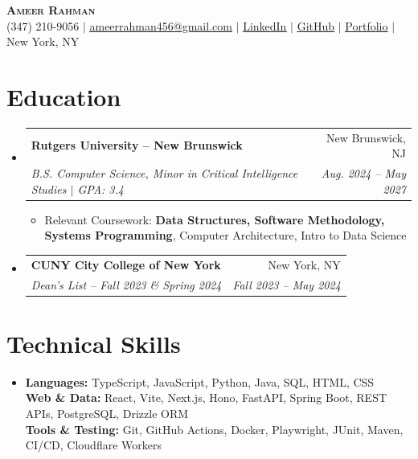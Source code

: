 \documentclass[letterpaper,10pt]{article}
\makeatletter
\newcommand{\resumeItem}[1]{\item\small{#1}}
\newcommand{\resumeSubheading}[4]{
  \vspace{1pt}\item
  \begin{tabular*}{0.97\textwidth}[t]{l@{\extracolsep{\fill}}r}
    \textbf{#1} & #2 \\
    \textit{\small #3} & \textit{\small #4} \\
  \end{tabular*}\vspace{-3pt}
}
\newcommand{\resumeSubHeadingListStart}{\begin{itemize}[leftmargin=0.15in,label={},itemsep=0pt,topsep=0pt]}
\newcommand{\resumeSubHeadingListEnd}{\end{itemize}}
\newcommand{\resumeItemListStart}{\begin{itemize}[leftmargin=0.15in,label=\textbullet,itemsep=-2pt,topsep=0pt]}
\newcommand{\resumeItemListEnd}{\end{itemize}\vspace{0pt}}
\makeatother
\begin{document}
\begin{center}
  {\Huge\scshape\textbf{Ameer Rahman}} \\ \vspace{2pt}
  \small (347) 210-9056 $|$
  \href{mailto:ameerrahman456@gmail.com}{\underline{ameerrahman456@gmail.com}} $|$
  \href{https://www.linkedin.com/in/ameer-rahman-a3bb232a0/}{\underline{LinkedIn}} $|$
  \href{https://github.com/ameer-rah}{\underline{GitHub}} $|$
  \href{https://ameer-rahman.info/}{\underline{Portfolio}} $|$ New York, NY
\end{center}

\section{Education}
\resumeSubHeadingListStart
  \resumeSubheading{Rutgers University -- New Brunswick}{New Brunswick, NJ}
    {B.S. Computer Science, Minor in Critical Intelligence Studies $|$ GPA: 3.4}{Aug. 2024 -- May 2027}
    \resumeItemListStart
      \resumeItem{Relevant Coursework: \textbf{Data Structures, Software Methodology, Systems Programming}, Computer Architecture, Intro to Data Science}
    \resumeItemListEnd
  \resumeSubheading{CUNY City College of New York}{New York, NY}
    {Dean's List -- Fall 2023 \& Spring 2024}{Fall 2023 -- May 2024}
\resumeSubHeadingListEnd

\section{Technical Skills}
\begin{itemize}[leftmargin=0.15in,label={},topsep=0pt]
  \small\item{
    \textbf{Languages:} TypeScript, JavaScript, Python, Java, SQL, HTML, CSS \\
    \textbf{Web \& Data:} React, Vite, Next.js, Hono, FastAPI, Spring Boot, REST APIs, PostgreSQL, Drizzle ORM \\
    \textbf{Tools \& Testing:} Git, GitHub Actions, Docker, Playwright, JUnit, Maven, CI/CD, Cloudflare Workers
  }
\end{itemize}
\end{document}
